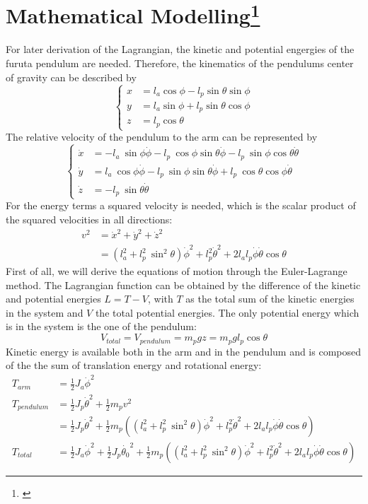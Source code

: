 \section{Mathematical 
Modelling\protect\footnote[1]{\cite{akhtaruzzaman2010modeling,furuta1992swing,gafvert2016modelling,
		ozbek2010swing,zhang2011optimal,fairus2013fuzzy}}} 
For later derivation of the Lagrangian, the kinetic and potential engergies of 
the furuta pendulum are needed. Therefore, the kinematics of the pendulums 
center of gravity can be described by 
\[\begin{cases}
x&=l_a\cos\phi-l_{p}\sin\theta\sin\phi \\ 
y&=l_a\sin\phi+l_{p}\sin\theta\cos\phi \\ 
z&=l_{p}\cos\theta
\end{cases} \] 
The relative velocity of the pendulum to the arm can be represented by 
\[ \begin{cases}
\dot{x}&=-l_a\ \sin \phi \dot{\phi}-l_{p}\ \cos\phi \sin\theta\dot{\phi}-l_{p} 
\ \sin\phi \cos\theta\dot{\theta} \\ 
\dot{y} &=l_a\ \cos\phi\dot{\phi}-l_{p} \ \sin\phi \sin\theta\dot{\phi}+l_{p} 
\ \cos\theta \cos\phi\dot{\theta} \\
 \dot{z}&=-l_{p} \ \sin\theta\dot{\theta}
\end{cases}\]
For the energy terms a squared velocity is needed, which is the scalar product 
of the squared velocities in all directions:
\begin{align*}v^2&=\dot{x}^2+\dot{y}^2+\dot{z}^2\\
&=(l_a^2+l_p^2\ 
\sin^2\theta)\dot{\phi}^2+l_p^2\dot{\theta}^2+2l_al_p\dot{\phi}\dot{\theta}\cos 
\theta\end{align*} %
First of all, we will derive the equations of motion through the Euler-Lagrange 
method. The Lagrangian function can be obtained by the difference of the 
kinetic and potential energies $L=T-V$, with $T$ as the total sum of the 
kinetic energies in the system and $V$ the total potential energies.
The only potential energy which is in the system is the one of the pendulum:
\[V_{total}=V_{pendulum}=m_pgz= m_pgl_{p}\cos\theta\]
Kinetic energy is available both in the arm and in the pendulum and is composed 
of the the sum of translation energy and rotational energy:
\begin{align*}
T_{arm}&=\frac{1}{2}J_a\dot{\phi}^2\\
T_{pendulum}&=\frac{1}{2}J_p\dot{\theta}^2+\frac{1}{2}m_pv^2\\
&= \frac{1}{2}J_p\dot{\theta}^2+\frac{1}{2}m_p\left((l_a^2+l_p^2\ 
\sin^2\theta)\dot{\phi}^2+l_p^2\dot{\theta}^2+2l_al_p\dot{\phi}\dot{\theta}\cos 
\theta\right)\\
T_{total}&= 
\frac{1}{2}J_a\dot{\phi}^2+\frac{1}{2}J_p\dot{\theta_0}^2+\frac{1}{2}m_p\left((l_a^2+l_p^2\
\sin^2\theta)\dot{\phi}^2+l_p^2\dot{\theta}^2+2l_al_p\dot{\phi}\dot{\theta}\cos 
\theta\right)
\end{align*}
